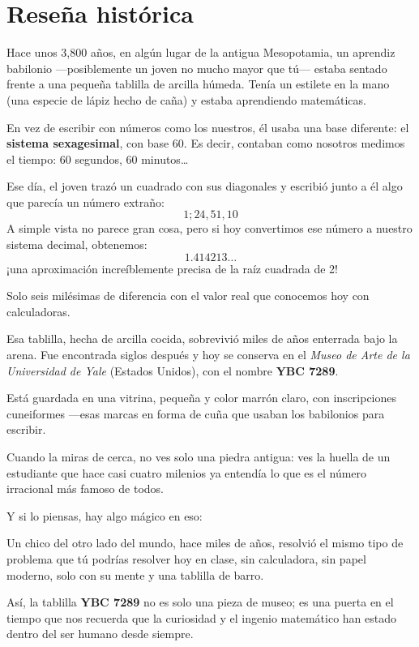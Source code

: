 
\vspace{1cm}

\vspace{1em} %
\section*{Reseña histórica}

\begin{reseñaplana}
Hace unos 3{,}800 años, en algún lugar de la antigua Mesopotamia, un aprendiz babilonio —posiblemente 
un joven no mucho mayor que tú— estaba sentado frente a una pequeña tablilla de arcilla húmeda. 
Tenía un estilete en la mano (una especie de lápiz hecho de caña) y estaba aprendiendo matemáticas.

En vez de escribir con números como los nuestros, él usaba una base diferente: el \textbf{sistema sexagesimal}, 
con base 60. Es decir, contaban como nosotros medimos el tiempo: 60 segundos, 60 minutos…

Ese día, el joven trazó un cuadrado con sus diagonales y escribió junto a él algo que parecía un número extraño:
\[
1;24,51,10
\]
A simple vista no parece gran cosa, pero si hoy convertimos ese número a nuestro sistema decimal, obtenemos:
\[
1.414213\dots
\]
¡una aproximación increíblemente precisa de la raíz cuadrada de 2!

Solo seis milésimas de diferencia con el valor real que conocemos hoy con calculadoras.

Esa tablilla, hecha de arcilla cocida, sobrevivió miles de años enterrada bajo la arena. Fue encontrada siglos
después y hoy se conserva en el \textit{Museo de Arte de la Universidad de Yale} (Estados Unidos), con el 
nombre \textbf{YBC 7289}.

Está guardada en una vitrina, pequeña y color marrón claro, con inscripciones cuneiformes 
—esas marcas en forma de cuña que usaban los babilonios para escribir.

Cuando la miras de cerca, no ves solo una piedra antigua: ves la huella de un estudiante que hace casi cuatro 
milenios ya entendía lo que es el número irracional más famoso de todos.

Y si lo piensas, hay algo mágico en eso:

Un chico del otro lado del mundo, hace miles de años, resolvió el mismo tipo de problema que tú podrías 
resolver hoy en clase, sin calculadora, sin papel moderno, solo con su mente y una tablilla de barro.


Así, la tablilla \textbf{YBC 7289} no es solo una pieza de museo; es una puerta en el tiempo que nos recuerda 
que la curiosidad y el ingenio matemático han estado dentro del ser humano desde siempre.
\end{reseñaplana}


